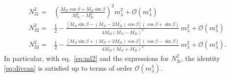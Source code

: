 \begin{align}
\label{eq:mixl2}
N_{31}^2=&\left(\frac{M_{D} \cos\beta + M_{N} \sin\beta}{M_{N}^{2}- M_{D}^{2}} \right)^{2}   m_{\lambda}^{2}
+\mathcal{O}\left( m_{\lambda}^4 \right)\nonumber\\
N_{32}^2=&\frac{1}{2}-\frac{\left[M_{N} \sin\beta - \left( M_{N}- 2 M_{D}\right) \cos\beta\right] \left(\cos\beta+\sin\beta \right)}{4 M_{D} \left(M_{N}- M_{D}\right)^{2}}\,m_{\lambda}^{2}+\mathcal{O}\left( m_{\lambda}^4 \right)  \nonumber\\
N_{33}^2=&\frac{1}{2}- \frac{\left[M_{N} \sin\beta + \left(M_{N} + 2 M_{D}\right) \cos\beta\right] \left(\cos\beta- \sin\beta \right)}{4 M_{D} \left(M_{N} + M_{D} \right)^{2}} \,m_{\lambda}^{2}+\mathcal{O}\left( m_{\lambda}^4 \right).
\end{align}
In particular, with eq.~\eqref{eq:ml2} and the expressions for $N_{3i}^2$, the identity \eqref{eq:divcan}
is satisfied up to terms of order $\mathcal{O}\left( m_{\lambda}^4
\right)$.
